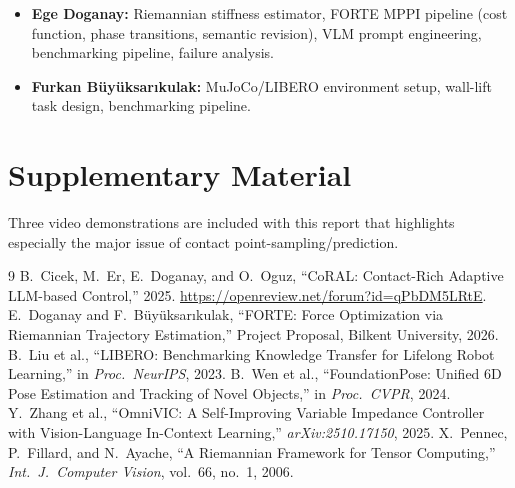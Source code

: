 \documentclass[10pt,twocolumn]{article}
\begin{document}
\begin{itemize}
\item \textbf{Ege Doganay:} Riemannian stiffness estimator, FORTE MPPI pipeline (cost function, phase transitions, semantic revision), VLM prompt engineering, benchmarking pipeline, failure analysis.
\item \textbf{Furkan B\"{u}y\"{u}ksar{\i}kulak:} MuJoCo/LIBERO environment setup, wall-lift task design, benchmarking pipeline.
\end{itemize}

\section{Supplementary Material}

Three video demonstrations are included with this report that highlights especially the major issue of contact point-sampling/prediction.

\begin{thebibliography}{9}
 B.~Cicek, M.~Er, E.~Doganay, and O.~Oguz, ``CoRAL: Contact-Rich Adaptive LLM-based Control,'' 2025. \url{https://openreview.net/forum?id=qPbDM5LRtE}.
 E.~Doganay and F.~B\"{u}y\"{u}ksar{\i}kulak, ``FORTE: Force Optimization via Riemannian Trajectory Estimation,'' Project Proposal, Bilkent University, 2026.
 B.~Liu et al., ``LIBERO: Benchmarking Knowledge Transfer for Lifelong Robot Learning,'' in \textit{Proc.\ NeurIPS}, 2023.
 B.~Wen et al., ``FoundationPose: Unified 6D Pose Estimation and Tracking of Novel Objects,'' in \textit{Proc.\ CVPR}, 2024.
 Y.~Zhang et al., ``OmniVIC: A Self-Improving Variable Impedance Controller with Vision-Language In-Context Learning,'' \textit{arXiv:2510.17150}, 2025.
 X.~Pennec, P.~Fillard, and N.~Ayache, ``A Riemannian Framework for Tensor Computing,'' \textit{Int.\ J.\ Computer Vision}, vol.~66, no.~1, 2006.
\end{thebibliography}
\end{document}
